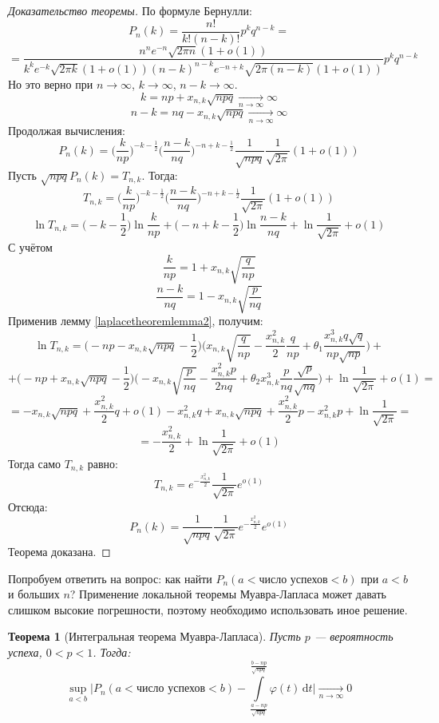 \documentclass[11pt,openany,a4paper]{scrartcl}
\theoremstyle{plain}
\newtheorem{theorem}{Теорема}[subsection]
\theoremstyle{definition}
\newcommand{\underto}[1]{\xrightarrow[#1]{}}
\newcommand{\dif}{\, \mathrm d}
\begin{document}
\begin{proof}[Доказательство теоремы]
    По формуле Бернулли:
    $$
    P_n(k) = \frac{n!}{k!(n-k)!}p^k q^{n-k} =
    $$
    $$
    =
    \frac{n^n e^{-n}\sqrt{2\pi n} (1 + o(1))}{k^k e^{-k} \sqrt{2\pi k} (1 + o(1))
    (n-k)^{n-k} e^{-n+k}\sqrt{2\pi (n-k)}(1 + o(1))} p^kq^{n-k}
    $$
    Но это верно при $n \to \infty$, $k \to \infty$, $n-k \to \infty$.
    $$
    k = np + x_{n,k}\sqrt{npq} \underto{n \to \infty} \infty
    $$
    $$
    n-k = nq - x_{n,k}\sqrt{npq} \underto{n \to \infty} \infty
    $$
    Продолжая вычисления:
    $$
    P_n(k) = \bigg(\frac{k}{np}\bigg)^{-k-\frac{1}{2}}\bigg(\frac{n-k}{nq}\bigg)^{-n+k-\frac{1}{2}}
    \frac{1}{\sqrt{npq}}\frac{1}{\sqrt{2\pi}}(1 + o(1))
    $$
    Пусть $\sqrt{npq}P_n(k) = T_{n,k}$. Тогда:
    $$
    T_{n,k} = \bigg(\frac{k}{np}\bigg)^{-k-\frac{1}{2}}
    \bigg(\frac{n-k}{nq}\bigg)^{-n+k-\frac{1}{2}}
    \frac{1}{\sqrt{2\pi}}(1 + o(1))
    $$
    $$
    \ln T_{n,k} = \bigg(-k - \frac{1}{2}\bigg)\ln \frac{k}{np} + \bigg(-n+k-\frac{1}{2}\bigg)
    \ln \frac{n-k}{nq} + \ln \frac{1}{\sqrt{2\pi}} + o(1)
    $$
    С учётом
    $$
    \frac{k}{np} = 1 + x_{n,k}\sqrt{\frac{q}{np}}
    $$
    $$
    \frac{n-k}{nq} = 1 - x_{n,k}\sqrt{\frac{p}{nq}}
    $$
    Применив лемму \ref{laplacetheoremlemma2}, получим:
    $$
    \ln T_{n,k} = \bigg(-np - x_{n,k}\sqrt{npq} -
    \frac{1}{2}\bigg)\bigg(x_{n,k}\sqrt{\frac{q}{np}} -
    \frac{x_{n,k}^2}{2}\frac{q}{np} + \theta_1 \frac{x_{n,k}^3 q\sqrt{q}}{np\sqrt{np}}\bigg) +
    $$
    $$
    + \bigg(-np + x_{n,k}\sqrt{npq} - \frac{1}{2}\bigg)\bigg(-x_{n,k}\sqrt{\frac{p}{nq}} -
    \frac{x_{n,k}^2p}{2nq} + \theta_2x_{n,k}^3\frac{p}{nq}\frac{\sqrt{p}}{\sqrt{nq}}\bigg) +
    \ln \frac{1}{\sqrt{2\pi}} + o(1) =
    $$
    $$
    = -x_{n,k}\sqrt{npq} + \frac{x_{n,k}^2}{2}q + o(1) - x_{n,k}^2q +
    x_{n,k}\sqrt{npq} + \frac{x_{n,k}^2}{2}p
    - x_{n,k}^2p + \ln \frac{1}{\sqrt{2\pi}} =
    $$
    $$
    =-\frac{x_{n,k}^2}{2} + \ln \frac{1}{\sqrt{2\pi}} + o(1) 
    $$
    Тогда само $T_{n,k}$ равно:
    $$
    T_{n,k} = e^{-\frac{x_{n,k}^2}{2}} \frac{1}{\sqrt{2\pi}} e^{o(1)}
    $$
    Отсюда:
    $$
    P_n(k) = \frac{1}{\sqrt{npq}}\frac{1}{\sqrt{2\pi}}e^{-\frac{x^2_{n,k}}{2}}
    e^{o(1)}
    $$
    Теорема доказана.
\end{proof}

Попробуем ответить на вопрос: как найти $P_n(a < \text{число успехов} < b)$
при $a<b$ и больших $n$? Применение локальной теоремы Муавра-Лапласа может давать
слишком высокие погрешности, поэтому необходимо использовать иное решение.
\begin{theorem}[Интегральная теорема Муавра-Лапласа]\label{integral_theorem}
    Пусть $p$ — вероятность успеха, $0 < p < 1$. Тогда:
    $$
    \sup_{a<b} \Bigg| P_n(a < \text{число успехов} < b) -
    \int\limits_{\frac{a - np}{\sqrt{npq}}}^{\frac{b-np}{\sqrt{npq}}}
    \varphi(t) \dif t \Bigg| \underto{n \to \infty} 0
    $$
\end{theorem}
\end{document}

